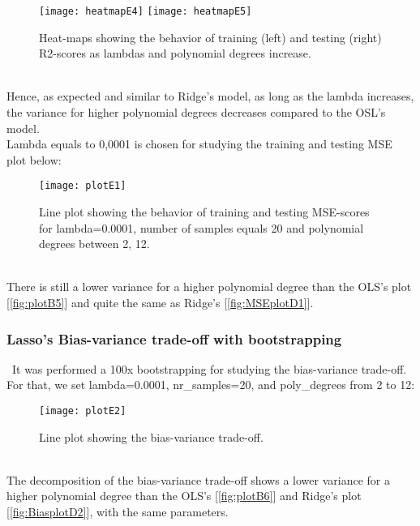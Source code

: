 \begin{figure}[H]
\label{fig:heatmapE4andE5}
\centering
\texttt{[image: heatmapE4]}
\texttt{[image: heatmapE5]}
\caption{Heat-maps showing the behavior of training (left) and testing (right) R2-scores as lambdas and polynomial degrees increase.}
\end{figure}\\

Hence, as expected and similar to Ridge's model, as long as the lambda increases, the variance for higher polynomial degrees decreases compared to the OSL's model. \\

Lambda equals to 0,0001 is chosen for studying the training and testing MSE plot below: \\

\begin{figure}[H]
\label{fig:plotE1}
\centering
\texttt{[image: plotE1]}
\caption{Line plot showing the behavior of training and testing MSE-scores for lambda=0.0001, number of samples equals 20 and polynomial degrees between 2, 12.}
\end{figure}\\

There is still a lower variance for a higher polynomial degree than the OLS's plot [\ref{fig:plotB5}] and quite the same as Ridge's [\ref{fig:MSEplotD1}].\\

\subsubsection{Lasso's Bias-variance trade-off with bootstrapping}
\label{chap:Lasso's Bias-variance trade-off with bootstrapping}

\quad \, It was performed a 100x bootstrapping for studying the bias-variance trade-off. For that, we set lambda=0.0001, nr\_samples=20, and poly\_degrees from 2 to 12:\\

\begin{figure}[H]
\label{fig:BiasplotE2}
\centering
\texttt{[image: plotE2]}
\caption{Line plot showing the bias-variance trade-off.}
\end{figure}\\

The decomposition of the bias-variance trade-off shows a lower variance for a higher polynomial degree than the OLS's [\ref{fig:plotB6}] and Ridge's plot [\ref{fig:BiasplotD2}], with the same parameters.\\

